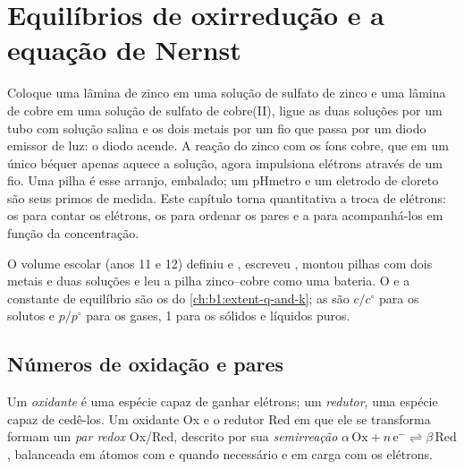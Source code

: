 \chapter{Equilíbrios de oxirredução e a equação de Nernst}\label{ch:b1:nernst}

Coloque uma lâmina de zinco em uma solução de sulfato de zinco e uma
lâmina de cobre em uma solução de sulfato de cobre(II), ligue as duas
soluções por um tubo com solução salina e os dois metais por um fio que
passa por um diodo emissor de luz: o diodo acende. A reação do zinco com
os íons cobre, que em um único béquer apenas aquece a solução, agora
impulsiona elétrons através de um fio. Uma pilha é esse arranjo,
embalado; um pHmetro e um eletrodo de cloreto são seus primos de medida.
Este capítulo torna quantitativa a troca de elétrons: os  para contar os elétrons, os  para
ordenar os pares e a  para acompanhá-los em função da
concentração.

\begin{recall}
O volume escolar (anos 11 e 12) definiu  e , escreveu
, montou pilhas com dois metais e duas soluções e leu a
pilha zinco--cobre como uma bateria. O  e a constante
de equilíbrio são os do \cref{ch:b1:extent-q-and-k}; as  são
$c/c^\circ$ para os solutos e $p/p^\circ$ para os gases, 1 para os
sólidos e líquidos puros.
\end{recall}

\section{Números de oxidação e pares}

\begin{definition}\label{def:b1:nernst:couple}
Um \emph{oxidante} é uma espécie capaz de ganhar
elétrons; um \emph{redutor}, uma espécie capaz de
cedê-los. Um oxidante Ox e o redutor Red em que ele se transforma formam
um \emph{par redox} Ox/Red, descrito por sua
\emph{semirreação}
$\alpha\,\mathrm{Ox} + n\,\mathrm{e^-} \rightleftharpoons
\beta\,\mathrm{Red}$, balanceada em átomos com  e  quando
necessário e em carga com os elétrons.
\end{definition}


